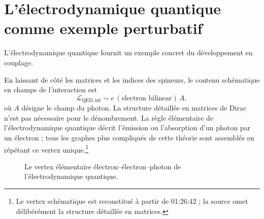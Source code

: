 \section{L’électrodynamique quantique comme exemple perturbatif}

L’électrodynamique quantique fournit un exemple concret du développement en couplage.

\begin{classroomqa}
\end{classroomqa}

En laissant de côté les matrices et les indices des spineurs, le contenu schématique en champs de l’interaction est
\begin{equation}
\mathcal{L}_{\mathrm{QED,int}}
\sim e\,(\text{electron bilinear})\,A,
\end{equation}
où \(A\) désigne le champ du photon. La structure détaillée en matrices de Dirac n’est pas nécessaire pour le dénombrement. La règle élémentaire de l’électrodynamique quantique décrit l’émission ou l’absorption d’un photon par un électron ; tous les graphes plus compliqués de cette théorie sont assemblés en répétant ce vertex unique.\footnote{Le vertex schématique est reconstitué à partir de 01:26:42 ; la source omet délibérément la structure détaillée en matrices.}

\begin{figure}[htbp]
\centering
{}
\caption{Le vertex élémentaire électron--électron--photon de l’électrodynamique quantique.}
\end{figure}

\begin{classroomqa}
\end{classroomqa}

